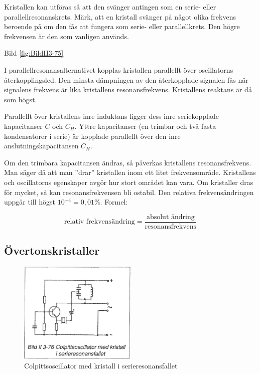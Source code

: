 Kristallen kan utföras så att den svänger antingen som en serie- eller
parallellresonanskrets. Märk, att en kristall svänger på något olika
frekvens beroende på om den fås att fungera som serie- eller
parallellkrets. Den högre frekvensen är den som vanligen används.

Bild \ref{fig:BildII3-75}

I parallellresonansalternativet kopplas kristallen parallellt över
oscillatorns återkopplingsled. Den minsta dämpningen av den
återkopplade signalen fås när signalens frekvens är lika kristallens
resonansfrekvens. Kristallens reaktans är då som högst.

Parallellt över kristallens inre induktans ligger dess inre
seriekopplade kapacitanser \(C\) och \(C_H\). Yttre kapacitanser (en
trimbar och två fasta kondensatorer i serie) är kopplade parallellt
över den inre anslutningskapacitansen \(C_H\).

Om den trimbara kapacitansen ändras, så påverkas kristallens
resonansfrekvens.  Man säger då att man ''drar'' kristallen inom ett
litet frekvensområde. Kristallens och oscillatorns egenskaper avgör
hur stort området kan vara. Om kristaller dras för mycket, så kan
resonansfrekvensen bli ostabil. Den relativa frekvensändringen uppgår
till högst \(10^{-4} = 0,01\%\). Formel:

\[
\text{relativ frekvensändring} =
\frac{\text{absolut ändring}}{\text{resonansfrekvens}}
\]

\subsection{Övertonskristaller}

\begin{figure}
\includegraphics[width=0.5\textwidth]{images/bild_2_3-76}
\caption{Colpittsoscillator med kristall i serieresonansfallet}
\label{fig:BildII3-76}
\end{figure}

